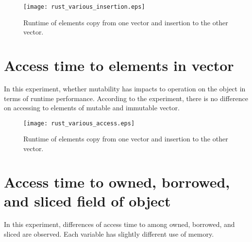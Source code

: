 \begin{figure}[htb]
    \texttt{[image: rust\_various\_insertion.eps]}
    \caption{Runtime of elements copy from one vector and insertion to the other vector.}
    \label{fig:Sampling}
\end{figure}
\clearpage

\section{Access time to elements in vector}
\label{sec:history}
In this experiment, whether mutability has impacts to operation on the object in terms of runtime performance. 
According to the experiment, there is no difference on accessing to elements of mutable and immutable vector.

\begin{figure}[htb]
    \texttt{[image: rust\_various\_access.eps]}
    \caption{Runtime of elements copy from one vector and insertion to the other vector.}
    \label{fig:Sampling}
\end{figure}

\section{Access time to owned, borrowed, and sliced field of object}
\label{sec:history}
In this experiment, differences of access time to among owned, borrowed, and sliced are observed. 
Each variable has slightly different use of memory. 


